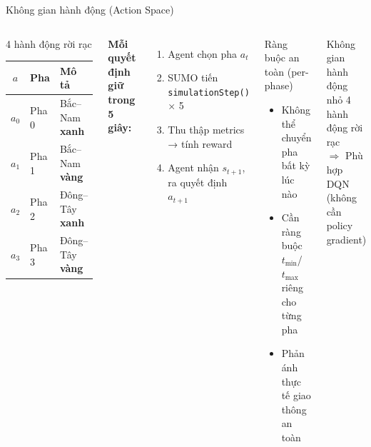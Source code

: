\begin{frame}{Không gian hành động (Action Space)}
  \begin{columns}[T]
    \begin{block}{4 hành động rời rạc}
      \begin{center}
      \begin{tabular}{clp{4.5cm}}
        \toprule
        \textbf{$a$} & \textbf{Pha} & \textbf{Mô tả}\\
        \midrule
        $a_0$ & Pha 0 & Bắc--Nam \textcolor{techgreen}{\textbf{xanh}}\\
        $a_1$ & Pha 1 & Bắc--Nam \textcolor{softorange}{\textbf{vàng}}\\
        $a_2$ & Pha 2 & Đông--Tây \textcolor{techgreen}{\textbf{xanh}}\\
        $a_3$ & Pha 3 & Đông--Tây \textcolor{softorange}{\textbf{vàng}}\\
        \bottomrule
      \end{tabular}
      \end{center}
    \end{block}

    \vspace{6pt}
    \textbf{Mỗi quyết định giữ trong \alert{5 giây}:}
    \begin{enumerate}
      \item Agent chọn pha $a_t$
      \item SUMO tiến \texttt{simulationStep()} × 5
      \item Thu thập metrics → tính reward
      \item Agent nhận $s_{t+1}$, ra quyết định $a_{t+1}$
    \end{enumerate}

    \begin{exampleblock}{Ràng buộc an toàn (per-phase)}
      \begin{itemize}
        \item Không thể chuyển pha bất kỳ lúc nào
        \item Cần ràng buộc $t_{\min}$/$t_{\max}$ riêng cho từng pha
        \item Phản ánh thực tế giao thông an toàn
      \end{itemize}
    \end{exampleblock}
    \vspace{6pt}
    \begin{alertblock}{Không gian hành động nhỏ}
      4 hành động rời rạc\\
      $\Rightarrow$ Phù hợp DQN\\
      (không cần policy gradient)
    \end{alertblock}
  \end{columns}
\end{frame}

